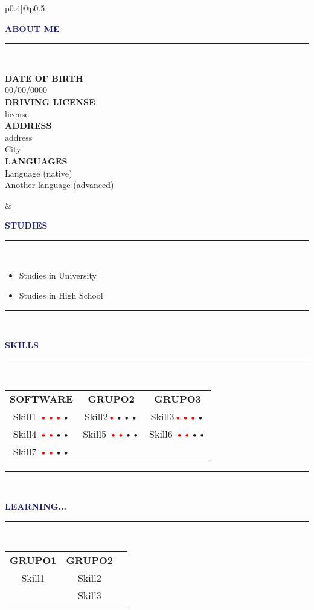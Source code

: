 \documentclass[12pt,a4paper]{article}
\newcommand{\myline}[1]{\rule{#1}{1.0pt}\\}
\newcommand{\topic}[1]{\textcolor{MidnightBlue}{\textbf{\Large\selectfont\MakeUppercase{#1}}\\\vspace{-0.5cm}\myline{1.0cm}}}
\newcommand{\uppersubtopicnnl}[1]{\textcolor{MidnightBlue!50}{\textbf{\normalsize\selectfont\MakeUppercase{#1}}}} %
\newcommand{\uppersubtopic}[1]{\uppersubtopicnnl{#1}\\}
\begin{document}
\begin{multicols}{2}
\begin{tabular}{p{0.4\textwidth}|@{\hspace{5mm}}p{0.5\textwidth}}
{\begin{flushleft}
\topic{about me}
\uppersubtopic{date of birth}
00/00/0000\\
\uppersubtopic{driving license}
license\\
\uppersubtopic{address} 
address\\
City\\
\uppersubtopic{languages}
Language (native)\\
Another language (advanced)\\
\end{flushleft}
}
&
{
\begin{flushleft}
\topic{studies}
\begin{itemize}
	\item{Studies in University}
	\item{Studies in High School}
\end{itemize}
\textcolor{CornflowerBlue}{\rule{\linewidth}{0.5pt}}\\
\topic{skills}
\begin{center}
\begin{NiceTabular}{>{}c | >{}c | >{}c}
	\uppersubtopicnnl{software} & \uppersubtopicnnl{grupo2} & \uppersubtopicnnl{grupo3}\\
	Skill1 \textcolor{Red}{•••}\textcolor{Red!30}{•} & Skill2\textcolor{Red}{•}\textcolor{Red!30}{•••} & Skill3\textcolor{Red}{•••}\textcolor{Red!30}{•}\\
	Skill4 \textcolor{Red}{••}\textcolor{Red!30}{••} & Skill5 \textcolor{Red}{••}\textcolor{Red!30}{••} & Skill6 \textcolor{Red}{••}\textcolor{Red!30}{••}\\
	Skill7 \textcolor{Red}{••}\textcolor{Red!30}{••} & &\\
\end{NiceTabular}
\end{center}
	
\textcolor{CornflowerBlue}{\rule{\linewidth}{0.5pt}}\\
    
\topic{learning...}
\begin{center}
\begin{NiceTabular}{>{}c | >{}c}
	\uppersubtopicnnl{grupo1} & \uppersubtopic{grupo2}
	Skill1 & Skill2\\
	& Skill3 \\
\end{NiceTabular}
\end{center}
    

\end{flushleft}
}
\end{tabular}
\end{multicols}
\end{document}

